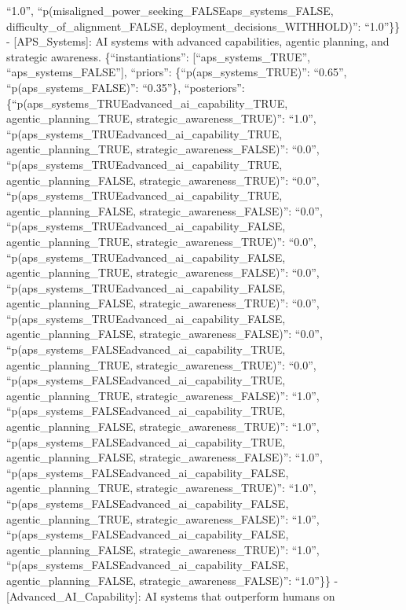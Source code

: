 \documentclass[
  11pt,
  letterpaper,
]{book}
\begin{document}
``1.0'',
``p(misaligned\_power\_seeking\_FALSE\textbar aps\_systems\_FALSE,
difficulty\_of\_alignment\_FALSE, deployment\_decisions\_WITHHOLD)'':
``1.0''\}\} - {[}APS\_Systems{]}: AI systems with advanced capabilities,
agentic planning, and strategic awareness. \{``instantiations'':
{[}``aps\_systems\_TRUE'', ``aps\_systems\_FALSE''{]}, ``priors'':
\{``p(aps\_systems\_TRUE)'': ``0.65'', ``p(aps\_systems\_FALSE)'':
``0.35''\}, ``posteriors'':
\{``p(aps\_systems\_TRUE\textbar advanced\_ai\_capability\_TRUE,
agentic\_planning\_TRUE, strategic\_awareness\_TRUE)'': ``1.0'',
``p(aps\_systems\_TRUE\textbar advanced\_ai\_capability\_TRUE,
agentic\_planning\_TRUE, strategic\_awareness\_FALSE)'': ``0.0'',
``p(aps\_systems\_TRUE\textbar advanced\_ai\_capability\_TRUE,
agentic\_planning\_FALSE, strategic\_awareness\_TRUE)'': ``0.0'',
``p(aps\_systems\_TRUE\textbar advanced\_ai\_capability\_TRUE,
agentic\_planning\_FALSE, strategic\_awareness\_FALSE)'': ``0.0'',
``p(aps\_systems\_TRUE\textbar advanced\_ai\_capability\_FALSE,
agentic\_planning\_TRUE, strategic\_awareness\_TRUE)'': ``0.0'',
``p(aps\_systems\_TRUE\textbar advanced\_ai\_capability\_FALSE,
agentic\_planning\_TRUE, strategic\_awareness\_FALSE)'': ``0.0'',
``p(aps\_systems\_TRUE\textbar advanced\_ai\_capability\_FALSE,
agentic\_planning\_FALSE, strategic\_awareness\_TRUE)'': ``0.0'',
``p(aps\_systems\_TRUE\textbar advanced\_ai\_capability\_FALSE,
agentic\_planning\_FALSE, strategic\_awareness\_FALSE)'': ``0.0'',
``p(aps\_systems\_FALSE\textbar advanced\_ai\_capability\_TRUE,
agentic\_planning\_TRUE, strategic\_awareness\_TRUE)'': ``0.0'',
``p(aps\_systems\_FALSE\textbar advanced\_ai\_capability\_TRUE,
agentic\_planning\_TRUE, strategic\_awareness\_FALSE)'': ``1.0'',
``p(aps\_systems\_FALSE\textbar advanced\_ai\_capability\_TRUE,
agentic\_planning\_FALSE, strategic\_awareness\_TRUE)'': ``1.0'',
``p(aps\_systems\_FALSE\textbar advanced\_ai\_capability\_TRUE,
agentic\_planning\_FALSE, strategic\_awareness\_FALSE)'': ``1.0'',
``p(aps\_systems\_FALSE\textbar advanced\_ai\_capability\_FALSE,
agentic\_planning\_TRUE, strategic\_awareness\_TRUE)'': ``1.0'',
``p(aps\_systems\_FALSE\textbar advanced\_ai\_capability\_FALSE,
agentic\_planning\_TRUE, strategic\_awareness\_FALSE)'': ``1.0'',
``p(aps\_systems\_FALSE\textbar advanced\_ai\_capability\_FALSE,
agentic\_planning\_FALSE, strategic\_awareness\_TRUE)'': ``1.0'',
``p(aps\_systems\_FALSE\textbar advanced\_ai\_capability\_FALSE,
agentic\_planning\_FALSE, strategic\_awareness\_FALSE)'': ``1.0''\}\} -
{[}Advanced\_AI\_Capability{]}: AI systems that outperform humans on
\end{document}
